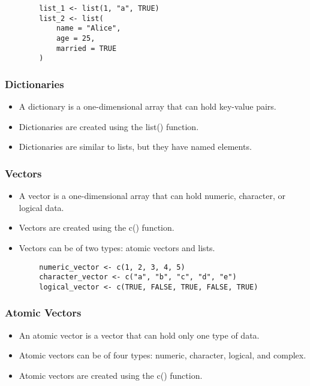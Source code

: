\documentclass[serif, 9pt, aspectratio=32]{beamer}
\begin{document}
\begin{frame}[fragile]
    \begin{lstlisting}
        list_1 <- list(1, "a", TRUE)
        list_2 <- list(
            name = "Alice",
            age = 25,
            married = TRUE
        )
    \end{lstlisting}
\end{frame}

\begin{frame}
    \centering
    \frametitle{Dictionaries}
    \begin{itemize}
        \setlength{\itemsep}{2em}
        \item A dictionary is a one-dimensional array that can hold key-value pairs.
        \item Dictionaries are created using the list() function.
        \item Dictionaries are similar to lists, but they have named elements.
    \end{itemize}
\end{frame}

\begin{frame}
    \centering
    \frametitle{Vectors}
    \begin{itemize}
        \setlength{\itemsep}{2em}
        \item A vector is a one-dimensional array that can hold numeric, character, or logical data.
        \item Vectors are created using the c() function.
        \item Vectors can be of two types: atomic vectors and lists.
    \end{itemize}
\end{frame}

\begin{frame}[fragile]
    \begin{lstlisting}
        numeric_vector <- c(1, 2, 3, 4, 5)
        character_vector <- c("a", "b", "c", "d", "e")
        logical_vector <- c(TRUE, FALSE, TRUE, FALSE, TRUE)
    \end{lstlisting}
\end{frame}

\begin{frame}
    \centering
    \frametitle{Atomic Vectors}
    \begin{itemize}
        \setlength{\itemsep}{2em}
        \item An atomic vector is a vector that can hold only one type of data.
        \item Atomic vectors can be of four types: numeric, character, logical, and complex.
        \item Atomic vectors are created using the c() function.
    \end{itemize}
\end{frame}
\end{document}
